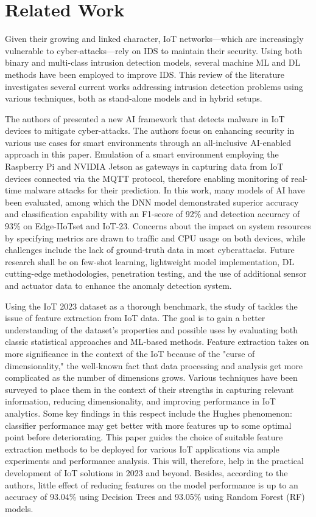 \section{Related Work}
\label{sec:Section2}
Given their growing and linked character, IoT networks—which are increasingly vulnerable to cyber-attacks—rely on IDS to maintain their security. Using both binary and multi-class intrusion detection models, several machine ML and DL methods have been employed to improve IDS. This review of the literature investigates several current works addressing intrusion detection problems using various techniques, both as stand-alone models and in hybrid setups.

The authors of \cite{bhandari_distributed_2023} presented a new AI framework that detects malware in IoT devices to mitigate cyber-attacks. The authors focus on enhancing security in various use cases for smart environments through an all-inclusive AI-enabled approach in this paper. Emulation of a smart environment employing the Raspberry Pi and NVIDIA Jetson as gateways in capturing data from IoT devices connected via the MQTT protocol, therefore enabling monitoring of real-time malware attacks for their prediction. In this work, many models of AI have been evaluated, among which the DNN model demonstrated superior accuracy and classification capability with an F1-score of 92\% and detection accuracy of 93\% on Edge-IIoTset and IoT-23. Concerns about the impact on system resources by specifying metrics are drawn to traffic and CPU usage on both devices, while challenges include the lack of ground-truth data in most cyberattacks. Future research shall 
be on few-shot learning, lightweight model implementation, DL cutting-edge methodologies, penetration testing, and the use of additional sensor and actuator data to enhance the anomaly detection system.

Using the IoT 2023 dataset as a thorough benchmark, the study of \cite{sarobin2024comparative} tackles the issue of feature extraction from IoT data. The goal is to gain a better understanding of the dataset's properties and possible uses by evaluating both classic statistical approaches and ML-based methods. Feature extraction takes on more significance in the context of the IoT because of the "curse of dimensionality," the well-known fact that data processing and analysis get more complicated as the number of dimensions grows. Various techniques have been surveyed to place them in the context of their strengths in capturing relevant information, reducing dimensionality, and improving performance in IoT analytics. Some key findings in this respect include the Hughes phenomenon: classifier performance may get better with more features up to some optimal point before deteriorating. This paper guides the choice of suitable feature extraction methods to be deployed for various IoT applications via ample experiments and performance analysis. This will, therefore, help in the practical development of IoT solutions in 2023 and beyond. Besides, according to the authors, little effect of reducing features on the model performance is up to an accuracy of 93.04\% using Decision Trees and 93.05\% using Random Forest (RF) models. 

